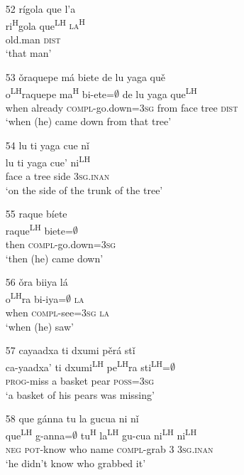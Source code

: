 \begin{itemize}
\item[52]
\glll r\'{i}gola que l'{a}\\
ri\textsuperscript{H}gola que\textsuperscript{LH} \textsc{la\textsuperscript{H}}\\
old.man \textsc{dist}\\
\glt `that man'


\item[53]
\glll \v{o}raquepe m\'{a} biete de lu yaga qu\v{e}\\
o\textsuperscript{LH}raquepe ma\textsuperscript{H} bi-ete=$\emptyset$ de lu yaga que\textsuperscript{LH}\\
when already \textsc{compl}-go.down=\textsc{3sg} from face tree \textsc{dist}\\
\glt `when (he) came down from that tree'


\item[54]
\glll lu ti yaga cue n\v{i}\\
lu ti yaga cue' ni\textsuperscript{LH}\\
face a tree side \textsc{3sg.inan}\\
\glt `on the side of the trunk of the tree'


\item[55]
\glll raque b\'{i}ete\\
raque\textsuperscript{LH}  biete=$\emptyset$\\
then \textsc{compl}-go.down=\textsc{3sg}\\
\glt `then (he) came down'


\item[56]
\glll \v{o}ra biiya l\'{a}\\
o\textsuperscript{LH}ra bi-iya=$\emptyset$ \textsc{la}\\
when \textsc{compl}-see=\textsc{3sg} \textsc{la}\\
\glt  `when (he) saw'


\item[57]
\glll cayaadxa ti dxumi p\v{e}r\'{a} st\v{i}\\
ca-yaadxa' ti dxumi\textsuperscript{LH} pe\textsuperscript{LH}ra sti\textsuperscript{LH}=$\emptyset$\\
\textsc{prog}-miss a basket pear \textsc{poss}=\textsc{3sg}\\
\glt  `a basket of his pears was missing'


\item[58]
\glll que g\'{a}nna tu la gucua ni n\v{i}\\
que\textsuperscript{LH} g-anna=$\emptyset$ tu\textsuperscript{H} la\textsuperscript{LH} gu-cua ni\textsuperscript{LH} ni\textsuperscript{LH}\\
\textsc{neg} \textsc{pot}-know who name \textsc{compl}-grab \textsc{3} \textsc{3sg.inan}\\
\glt `he didn't know who grabbed it'



\end{itemize}
